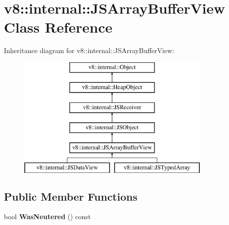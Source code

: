 \hypertarget{classv8_1_1internal_1_1_j_s_array_buffer_view}{}\section{v8\+:\+:internal\+:\+:J\+S\+Array\+Buffer\+View Class Reference}
\label{classv8_1_1internal_1_1_j_s_array_buffer_view}
Inheritance diagram for v8\+:\+:internal\+:\+:J\+S\+Array\+Buffer\+View\+:\begin{figure}[H]
\begin{center}
\leavevmode
\includegraphics[height=6.000000cm]{classv8_1_1internal_1_1_j_s_array_buffer_view}
\end{center}
\end{figure}
\subsection*{Public Member Functions}
\begin{DoxyCompactItemize}
\item 
bool {\bfseries Was\+Neutered} () const \hypertarget{classv8_1_1internal_1_1_j_s_array_buffer_view_af6503ab43cedf872a528cd633c82ecc2}{}\label{classv8_1_1internal_1_1_j_s_array_buffer_view_af6503ab43cedf872a528cd633c82ecc2}

\end{DoxyCompactItemize}
